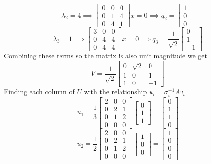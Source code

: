 \documentclass{article}
\begin{document}
$$
\lambda_2 = 4 \implies
\begin{bmatrix}
0 & 0 & 0 \\
0 & 1 & 4 \\
0 & 4 & 1
\end{bmatrix}
x
=0
\implies q_2 =
\begin{bmatrix}
1 \\
0 \\
0
\end{bmatrix}
$$
$$
\lambda_3 = 1 \implies
\begin{bmatrix}
3 & 0 & 0 \\
0 & 4 & 4 \\
0 & 4 & 4
\end{bmatrix}
x
=0
\implies q_3 =
\frac{1}{\sqrt{2}}
\begin{bmatrix}
0 \\
1 \\
-1
\end{bmatrix}
$$
Combining these terms so the matrix is also unit magnitude we get
$$
V =
\frac{1}{\sqrt{2}}
\begin{bmatrix}
0 & \sqrt{2} & 0 \\
1 & 0 & 1 \\
1 & 0 & -1
\end{bmatrix}
$$
Finding each column of $U$ with the relationship $u_i = \sigma_i^{-1}Av_i$
$$u_1 =
\frac{1}{3}
\begin{bmatrix}
2 & 0 & 0 \\
0 & 2 & 1 \\
0 & 1 & 2 \\
0 & 0 & 0
\end{bmatrix}
\begin{bmatrix}
0 \\
1 \\
1
\end{bmatrix}
=
\begin{bmatrix}
0 \\
1 \\
1 \\
0
\end{bmatrix}
$$
$$u_2 =
\frac{1}{2}
\begin{bmatrix}
2 & 0 & 0 \\
0 & 2 & 1 \\
0 & 1 & 2 \\
0 & 0 & 0
\end{bmatrix}
\begin{bmatrix}
1 \\
0 \\
0
\end{bmatrix}
=
\begin{bmatrix}
1 \\
0 \\
0 \\
0
\end{bmatrix}
$$
\end{document}
